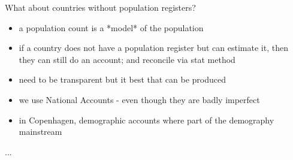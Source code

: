 \documentclass[USenglish]{article}
\begin{document}
What about countries without population registers?
\begin{itemize}
    \item a population count is a *model* of the population
    \item if a country does not have a population register but can estimate it, then they can still do an account; and reconcile via stat method
    \item need to be transparent but it best that can be produced
    \item we use National Accounts - even though they are badly imperfect
    \item in Copenhagen, demographic accounts where part of the demography mainstream
\end{itemize}


\begin{acknowledgement}
  ...
\end{acknowledgement}

%
%
\end{document}
